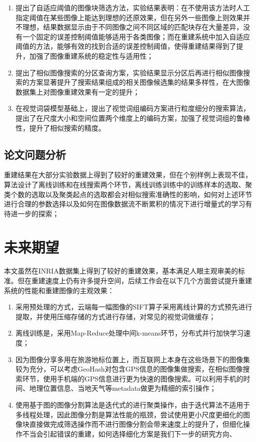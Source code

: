 \begin{enumerate}
\item 提出了自适应阈值的图像块筛选方法，实验结果表明：在不使用该方法时人工指定阈值在某些图像上能达到理想的还原效果，但在另外一些图像上则效果并不理想，结果数据显示由于不同图像之间不同区域的匹配块存在大量差异，没有一个固定的误差控制阈值能够适用于各类图像；而在重建系统中加入自适应阈值的方法，能够有效的找到合适的误差控制阈值，使得重建结果得到了提升，加强了图像重建系统的稳定性与适用性；
\item 提出了相似图像搜索的分区查询方案，实验结果显示分区后再进行相似图像搜索的方案显著提升了搜索结果组成的相关图像候选集的结果多样性，在大图像数据集上对图像重建效果有一定的提升；
\item 在视觉词袋模型基础上，提出了视觉词组编码方案进行粒度细分的搜索算法，提出了在尺度大小和空间位置两个维度上的编码方案，加强了视觉词组的鲁棒性，提升了相似搜索的精度。
\end{enumerate}

\subsection{论文问题分析}

重建结果在大部分实验数据上得到了较好的重建效果，但在个别样例上表现不佳，算法设计了离线训练和在线搜索两个环节，离线训练训练中的训练样本的选取、聚类个数的选取以及聚类起点的选取都会对相似搜索准确性的影响，如何对上述环节进行合理的参数选择以及如何在图像数据流不断累积的情况下进行增量式的学习有待进一步的探索；

\section{未来期望}

本文虽然在INRIA数据集上得到了较好的重建效果，基本满足人眼主观审美的标准。但在重建速度上仍有许多提升空间，后续工作会在以下几个方面尝试提升重建系统的性能和重建图像的主观效果：

\begin{enumerate}
\item 采用预处理的方式，云端每一幅图像的SIFT算子采用离线计算的方式预先进行提取，并使用压缩存储的方式进行存储，对常见的视觉词做缓存；
\item 离线训练是，采用Map-Reduce处理中间k-means环节，分布式并行加快学习速度；
\item 因为图像分享多用在旅游地标位置上，而互联网上本身在这些场景下的图像集较为充分，可以考虑GeoHash对包含GPS信息的图像集做搜索，在相似图像搜索环节，使用手机端的GPS信息进行更为快速的图像搜索。可以利用手机的时间、地理位置信息、当地天气等metadata做更为精细的索引操作；
\item 使用基于图的图像分割算法是迭代式的进行聚类操作，由于迭代算法不适用于多线程处理，因此图像分割是算法性能的瓶颈，尝试使用更小尺度更细化的图像块直接做完成筛选操作而不进行图像分割会带来速度上的提升了，但细化操作不当会引起错误的重建，如何选择细化方案是我们下一步的研究方向、
\end{enumerate}
